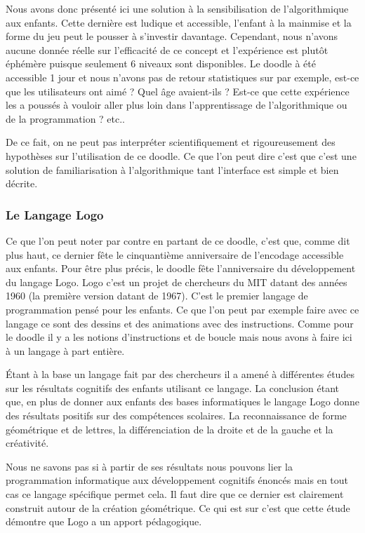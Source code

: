 Nous avons donc présenté ici une solution à la sensibilisation de l'algorithmique aux enfants. Cette dernière est ludique et accessible, l'enfant à la mainmise et la forme du jeu peut le pousser à s'investir davantage. Cependant, nous n'avons aucune donnée réelle sur l'efficacité de ce concept et l'expérience est plutôt éphémère puisque seulement 6 niveaux sont disponibles. Le doodle à été accessible 1 jour et nous n'avons pas de retour statistiques sur par exemple, est-ce que les utilisateurs ont aimé ? Quel âge avaient-ils ? Est-ce que cette expérience les a poussés à vouloir aller plus loin dans l'apprentissage de l'algorithmique ou de la programmation ? etc..

De ce fait, on ne peut pas interpréter scientifiquement et rigoureusement des hypothèses sur l'utilisation de ce doodle. Ce que l'on peut dire c'est que c'est une solution de familiarisation à l'algorithmique tant l'interface est simple et bien décrite.

\subsubsection{Le Langage Logo}

Ce que l'on peut noter par contre en partant de ce doodle, c'est que, comme dit plus haut, ce dernier fête le cinquantième anniversaire de l'encodage accessible aux enfants. Pour être plus précis, le doodle fête l'anniversaire du développement du langage Logo. \cite{12} Logo c'est un projet de chercheurs du MIT datant des années 1960 (la première version datant de 1967). C'est le premier langage de programmation pensé pour les enfants. Ce que l'on peut par exemple faire avec ce langage ce sont des dessins et des animations avec des instructions. Comme pour le doodle il y a les notions d'instructions et de boucle mais nous avons à faire ici à un langage à part entière. 

\newpage

Étant à la base un langage fait par des chercheurs il a amené à différentes études sur les résultats cognitifs des enfants utilisant ce langage. \cite{13}  La conclusion étant que, en plus de donner aux enfants des bases informatiques le langage Logo donne des résultats positifs sur des compétences scolaires. La reconnaissance de forme géométrique et de lettres, la différenciation de la droite et de la gauche et la créativité.

Nous ne savons pas si à partir de ses résultats nous pouvons lier la programmation informatique aux développement cognitifs énoncés mais en tout cas ce langage spécifique permet cela. Il faut dire que ce dernier est clairement construit autour de la création géométrique. Ce qui est sur c'est que cette étude démontre que Logo a un apport pédagogique. 

